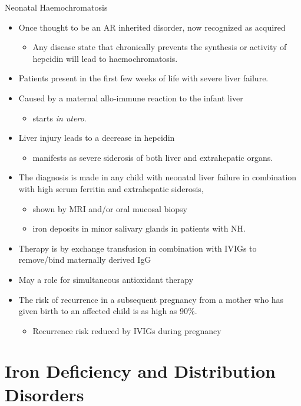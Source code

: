 \documentclass[presentation, smaller]{beamer}
\begin{document}
\begin{frame}[label={sec:org563bf33}]{Neonatal Haemochromatosis}
\begin{itemize}
\item Once thought to be an AR inherited disorder, now recognized as acquired
\begin{itemize}
\item Any disease state that chronically prevents the synthesis or
activity of hepcidin will lead to haemochromatosis.
\end{itemize}
\item Patients present in the first few weeks of life with severe liver
failure.
\item Caused by a maternal allo-immune reaction to the infant liver
\begin{itemize}
\item starts \emph{in utero}.
\end{itemize}
\item Liver injury leads to a decrease in hepcidin
\begin{itemize}
\item manifests as severe siderosis of both liver and extrahepatic organs.
\end{itemize}
\item The diagnosis is made in any child with neonatal liver failure in
combination with high serum ferritin and extrahepatic siderosis,
\begin{itemize}
\item shown by MRI and/or oral mucosal biopsy
\item iron deposits in minor salivary glands in patients with NH.
\end{itemize}
\item Therapy is by exchange transfusion in combination with IVIGs to remove/bind maternally derived IgG
\item May a role for simultaneous antioxidant therapy
\item The risk of recurrence in a subsequent pregnancy from a mother who
has given birth to an affected child is as high as 90\%.
\begin{itemize}
\item Recurrence risk reduced by IVIGs during pregnancy
\end{itemize}
\end{itemize}
\end{frame}

\section{Iron Deficiency and Distribution Disorders}
\label{sec:orgcbe1ae7}
\end{document}
